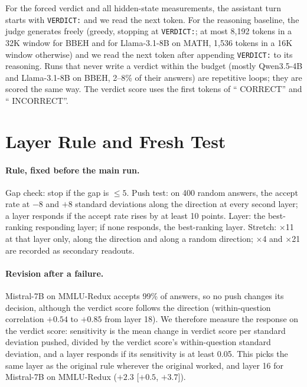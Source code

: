 For the forced verdict and all hidden-state measurements, the assistant turn starts with \texttt{VERDICT:} and we read the next token. For the reasoning baseline, the judge generates freely (greedy, stopping at \texttt{VERDICT:}; at most 8,192 tokens in a 32K window for BBEH and for Llama-3.1-8B on MATH, 1,536 tokens in a 16K window otherwise) and we read the next token after appending \texttt{VERDICT:} to its reasoning. Runs that never write a verdict within the budget (mostly Qwen3.5-4B and Llama-3.1-8B on BBEH, 2--8\% of their answers) are repetitive loops; they are scored the same way. The verdict score uses the first tokens of `` CORRECT'' and `` INCORRECT''.

\section{Layer Rule and Fresh Test}
\label{app:rule}

\paragraph{Rule, fixed before the main run.} Gap check: stop if the gap is $\le 5$. Push test: on 400 random answers, the accept rate at $-8$ and $+8$ standard deviations along the direction at every second layer; a layer responds if the accept rate rises by at least 10 points. Layer: the best-ranking responding layer; if none responds, the best-ranking layer. Stretch: $\times$11 at that layer only, along the direction and along a random direction; $\times$4 and $\times$21 are recorded as secondary readouts.

\paragraph{Revision after a failure.} Mistral-7B on MMLU-Redux accepts 99\% of answers, so no push changes its decision, although the verdict score follows the direction (within-question correlation $+0.54$ to $+0.85$ from layer 18). We therefore measure the response on the verdict score: sensitivity is the mean change in verdict score per standard deviation pushed, divided by the verdict score's within-question standard deviation, and a layer responds if its sensitivity is at least 0.05. This picks the same layer as the original rule wherever the original worked, and layer 16 for Mistral-7B on MMLU-Redux ($+2.3$ [$+0.5$, $+3.7$]).

